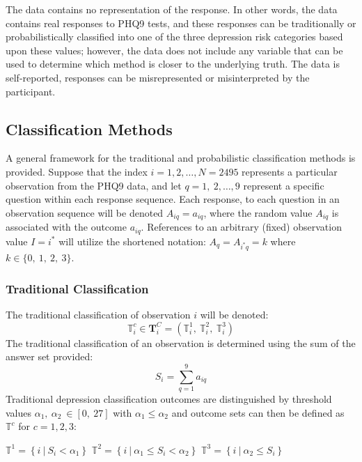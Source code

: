 \documentclass[12pt,]{article}
\begin{document}
The data contains no representation of the response. In other words, the
data contains real responses to PHQ9 tests, and these responses can be
traditionally or probabilistically classified into one of the three
depression risk categories based upon these values; however, the data
does not include any variable that can be used to determine which method
is closer to the underlying truth. The data is self-reported, responses
can be misrepresented or misinterpreted by the participant.

\hypertarget{classification-methods}{%
\subsection{Classification Methods}\label{classification-methods}}

A general framework for the traditional and probabilistic classification
methods is provided. Suppose that the index \(i=1, 2, \ldots, N=2495\)
represents a particular observation from the PHQ9 data, and let
\(q=1, \ 2, \ldots, 9\) represent a specific question within each
response sequence. Each response, to each question in an observation
sequence will be denoted \(A_{iq}=a_{iq}\), where the random value
\(A_{iq}\) is associated with the outcome \(a_{iq}\). References to an
arbitrary (fixed) observation value \(I=i^{*}\) will utilize the
shortened notation: \(A_{q}=A_{i^{*}q}=k\) where
\(k\in \{ 0,\ 1, \ 2, \ 3 \}\).

\hypertarget{traditional-classification}{%
\subsubsection{Traditional
Classification}\label{traditional-classification}}

The traditional classification of observation \(i\) will be denoted:
\[\mathbb{T}_{i}^{c} \in \mathbf{T}_{i}^{C}=\left(\mathbb{T}_{i}^{1}, \ \mathbb{T}_{i}^{2}, \ \mathbb{T}_{i}^{3} \right)\]
The traditional classification of an observation is determined using the
sum of the answer set provided: \[S_{i} = \sum_{q=1}^{9} a_{iq}\]
Traditional depression classification outcomes are distinguished by
threshold values
\newline \(\alpha_{1}, \ \alpha_{2} \ \in \left [0, \ 27 \right ]\) with
\(\alpha_{1} \leq \alpha_{2}\) and outcome sets can then be defined as
\(\mathbb{T}^{c}\) for \(c=1,2,3\):

\begin{center}
$\mathbb{T}^{1}=\left \{i \ \Big | \ S_{i} < \alpha_{1}  \right \}$ \hspace{5pt} $\mathbb{T}^{2}=\left \{i \ \Big | \ \alpha_{1} \leq S_{i} < \alpha_{2}  \right \}$ \hspace{5pt} $\mathbb{T}^{3}=\left \{i \ \Big | \ \alpha_{2} \leq S_{i}  \right \}$
\end{center}
\end{document}
